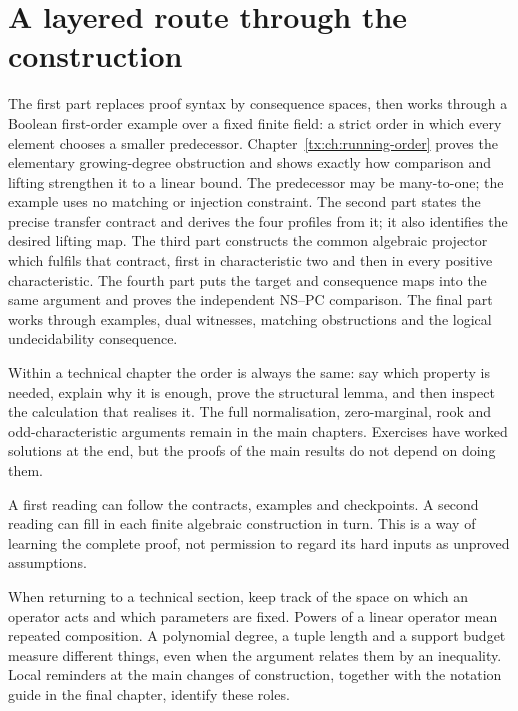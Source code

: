 \documentclass[11pt,a4paper,oneside,openany]{book}
\theoremstyle{definition}\newtheorem{definition}[theorem]{Definition}
\theoremstyle{remark}\newtheorem{remark}[theorem]{Remark}
\numberwithin{equation}{chapter}
\begin{document}
\section*{A layered route through the construction}
The first part replaces proof syntax by consequence spaces, then works
through a Boolean first-order example over a fixed finite field: a
strict order in which every element chooses a smaller predecessor.
Chapter~\ref{tx:ch:running-order} proves the elementary growing-degree
obstruction and shows exactly how comparison and lifting strengthen it
to a linear bound. The predecessor may be many-to-one; the example
uses no matching or injection constraint. The second
part states the precise transfer contract and derives the four profiles
from it; it also identifies the desired lifting map. The third part
constructs the common algebraic projector which fulfils that contract,
first in characteristic two and then in every positive characteristic.
The fourth part puts the target and consequence maps into the same
argument and proves the independent NS--PC comparison. The final part
works through examples, dual witnesses, matching obstructions and the
logical undecidability consequence.

Within a technical chapter the order is always the same: say which
property is needed, explain why it is enough, prove the structural
lemma, and then inspect the calculation that realises it. The full
normalisation, zero-marginal, rook and odd-characteristic arguments
remain in the main chapters. Exercises have worked solutions at the
end, but the proofs of the main results do not depend on doing them.

A first reading can follow the contracts, examples and checkpoints.
A second reading can fill in each finite algebraic construction in turn.
This is a way of learning the complete proof, not permission to regard
its hard inputs as unproved assumptions.

When returning to a technical section, keep track of the space on
which an operator acts and which parameters are fixed. Powers of a
linear operator mean repeated composition. A polynomial degree, a
tuple length and a support budget measure different things, even
when the argument relates them by an inequality. Local reminders at
the main changes of construction, together with the notation guide
in the final chapter, identify these roles.
\end{document}
